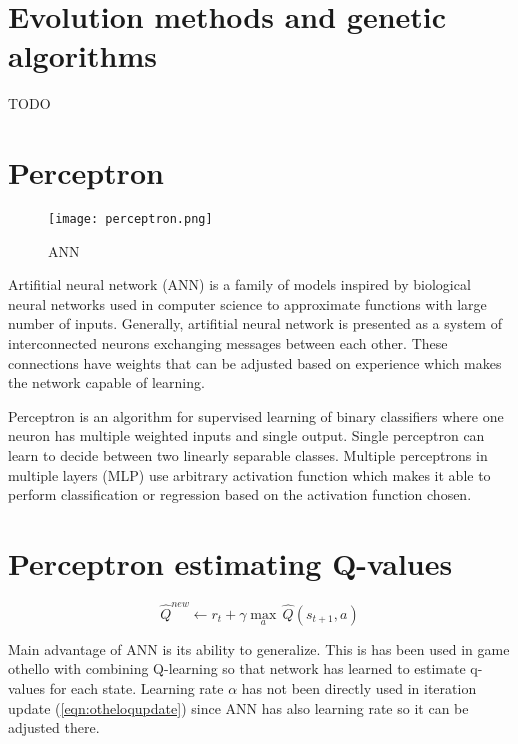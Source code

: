 \section{Evolution methods and genetic algorithms}
TODO

\section{Perceptron}
\begin{wrapfigure}{r}{0.4\textwidth}
  \vspace*{-1.85cm}
  \centering
  \texttt{[image: perceptron.png]}
  \vspace*{-0.85cm}
  \caption{ANN}
  \label{fig:network}
  \vspace*{-1.40cm}
\end{wrapfigure}

Artifitial neural network (ANN) is a family of models inspired by biological
neural networks used in computer science to approximate functions with
large number of inputs. Generally, artifitial neural network is presented
as a system of interconnected neurons exchanging messages between each
other. These connections have weights that can be adjusted based on
experience which makes the network capable of learning.

Perceptron is an algorithm for supervised learning of binary classifiers
where one neuron has multiple weighted inputs and single output. Single
perceptron can learn to decide between two linearly separable
classes. Multiple perceptrons in multiple layers (MLP) use arbitrary
activation function which makes it able to perform classification or
regression based on the activation function chosen.

\section{Perceptron estimating Q-values}
\begin{wrapfigure}{r}{0.42\textwidth}
  \vspace*{-1.15cm}
  \begin{equation}
    \label{eqn:otheloqupdate}
    \hat{Q}^{new}\!\leftarrow\!r_t\!+\!{\gamma}{\max_a}\,\hat{Q}(s_{t+1},\!a)
  \end{equation}
  \vspace*{-0.95cm}
\end{wrapfigure}

Main advantage of ANN is its ability to generalize. This is has been used
in game othello \cite{othello} with combining Q-learning so that network
has learned to estimate q-values for each state. Learning rate $\alpha$ has
not been directly used in iteration update (\ref{eqn:otheloqupdate}) since
ANN has also learning rate so it can be adjusted there.

